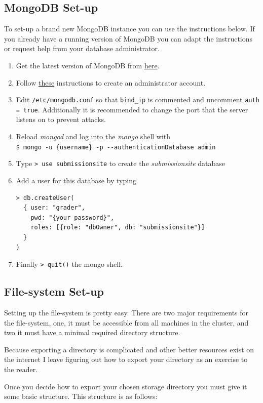 \documentclass[11pt]{report}
\begin{document}
\subsection{MongoDB Set-up}
To set-up a brand new MongoDB instance you can use the instructions below. If you already have a running version
of MongoDB you can adapt the instructions or request help from your database administrator.
\begin{enumerate}
\item Get the latest version of MongoDB from \href{http://docs.mongodb.org/manual/tutorial/install-mongodb-on-ubuntu/}{here}.
\item Follow \href{http://docs.mongodb.org/manual/tutorial/enable-authentication/}{these} instructions to create an administrator account.
\item Edit \verb|/etc/mongodb.conf| so that
\verb|bind_ip| is commented and uncomment
\verb|auth = true|. Additionally it is recommended to change the port that the server listens on
to prevent attacks.
\item Reload \emph{mongod} and log into the \emph{mongo} shell with\\
\verb|$ mongo -u {username} -p --authenticationDatabase admin|
\item Type \verb|> use submissionsite| to create the \emph{submissionsite} database
\item Add a user for this database by typing
\begin{verbatim}
> db.createUser(
  { user: "grader",
    pwd: "{your password}",
    roles: [{role: "dbOwner", db: "submissionsite"}]
  }
)
\end{verbatim}
\item Finally \verb|> quit()| the mongo shell.
\end{enumerate}

\subsection{File-system Set-up}
Setting up the file-system is pretty easy. There are two major requirements for the file-system, one, it
must be accessible from all machines in the cluster, and two it must have a minimal required directory
structure.

Because exporting a directory is complicated and other better resources exist on the internet I leave
figuring out how to export your directory as an exercise to the reader.

Once you decide how to export your chosen storage directory you must give it some basic structure. This
structure is as follows:
\end{document}
